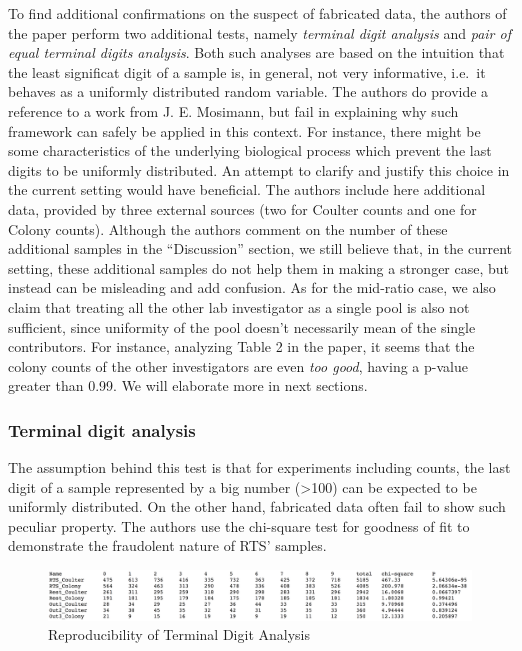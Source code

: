\documentclass{article}
\begin{document}
To find additional confirmations on the suspect of fabricated data, the
authors of the paper perform two additional tests, namely \emph{terminal
digit analysis} and \emph{pair of equal terminal digits analysis}. Both
such analyses are based on the intuition that the least significat digit
of a sample is, in general, not very informative, i.e.~it behaves as a
uniformly distributed random variable. The authors do provide a
reference to a work from J. E. Mosimann, but fail in explaining why such
framework can safely be applied in this context. For instance, there
might be some characteristics of the underlying biological process which
prevent the last digits to be uniformly distributed. An attempt to
clarify and justify this choice in the current setting would have
beneficial. The authors include here additional data, provided by three
external sources (two for Coulter counts and one for Colony counts).
Although the authors comment on the number of these additional samples
in the ``Discussion'' section, we still believe that, in the current
setting, these additional samples do not help them in making a stronger
case, but instead can be misleading and add confusion. As for the
mid-ratio case, we also claim that treating all the other lab
investigator as a single pool is also not sufficient, since uniformity
of the pool doesn't necessarily mean of the single contributors. For
instance, analyzing Table 2 in the paper, it seems that the colony
counts of the other investigators are even \emph{too good}, having a
p-value greater than 0.99. We will elaborate more in next sections.

\subsubsection{Terminal digit analysis}\label{terminal-digit-analysis}

The assumption behind this test is that for experiments including
counts, the last digit of a sample represented by a big number
(\textgreater{}100) can be expected to be uniformly distributed. On the
other hand, fabricated data often fail to show such peculiar property.
The authors use the chi-square test for goodness of fit to demonstrate
the fraudolent nature of RTS' samples.

\begin{figure}[htbp]
\centering
\includegraphics{images/term_repr.png}
\caption{Reproducibility of Terminal Digit Analysis}
\end{figure}
\end{document}
